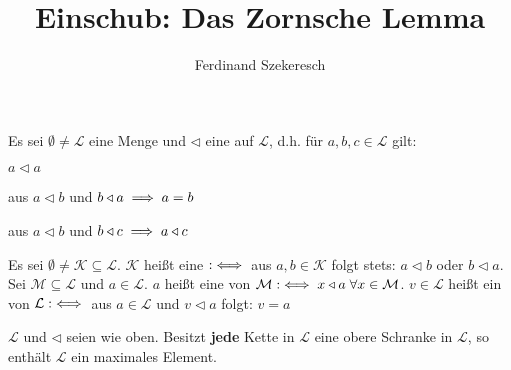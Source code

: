 \documentclass{article}
\title{Einschub: Das Zornsche Lemma}
\author{Ferdinand Szekeresch}
\begin{document}
\maketitle

Es sei $\emptyset \neq \mathcal{L}$ eine Menge und $\triangleleft$ eine  auf $\mathcal{L}$, d.h. für $a, b, c \in \mathcal{L}$ gilt:
\begin{liste}
\item $a \triangleleft a$ \\
\item aus $a \triangleleft b$ und $b \triangleleft a \implies a = b$ \\
\item aus $a \triangleleft b$ und $b \triangleleft c \implies a \triangleleft c$ \\
\end{liste}

Es sei $\emptyset \neq \mathcal{K} \subseteq \mathcal{L}$. $\mathcal{K}$ heißt eine  $:\iff$ aus $a, b \in \mathcal{K}$ folgt stets: $a \triangleleft b$ oder $b \triangleleft a$. Sei $\mathcal{M} \subseteq \mathcal{L}$ und $a \in \mathcal{L}$. $a$ heißt eine  von $\mathcal{M} :\iff x \triangleleft a \; \forall x \in \mathcal{M}$. $v \in \mathcal{L}$ heißt ein  von $\mathcal{L} :\iff$ aus $a \in \mathcal{L}$ und $v \triangleleft a$ folgt: $v = a$

\begin{lemma}
$\mathcal{L}$ und $\triangleleft$ seien wie oben. Besitzt \textbf{jede} Kette in $\mathcal{L}$ eine obere Schranke in $\mathcal{L}$, so enthält $\mathcal{L}$ ein maximales Element.
\end{lemma}
\end{document}
